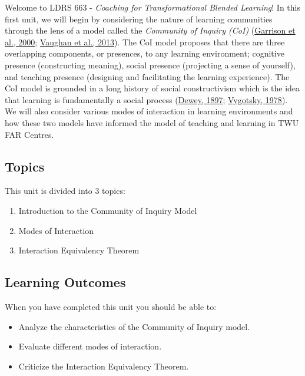 \documentclass[
]{book}
\providecommand{\tightlist}{%
  \setlength{\itemsep}{0pt}\setlength{\parskip}{0pt}}
\begin{document}
Welcome to LDRS 663 - \emph{Coaching for Transformational Blended Learning}! In this first unit, we will begin by considering the nature of learning communities through the lens of a model called the \emph{Community of Inquiry (CoI)} (\href{https://www.sciencedirect.com/science/article/pii/S1096751600000166?}{Garrison et al., 2000}; \href{http://www.aupress.ca/index.php/books/120229}{Vaughan et al., 2013}). The CoI model proposes that there are three overlapping components, or presences, to any learning environment; cognitive presence (constructing meaning), social presence (projecting a sense of yourself), and teaching presence (designing and facilitating the learning experience). The CoI model is grounded in a long history of social constructivism which is the idea that learning is fundamentally a social process (\href{https://en.wikisource.org/wiki/My_Pedagogic_Creed}{Dewey, 1897}; \href{https://twu.idm.oclc.org/login?url=http://search.ebscohost.com/login.aspx?direct=true\&db=cat05965a\&AN=alc.191437\&site=eds-live}{Vygotsky, 1978}). We will also consider various modes of interaction in learning environments and how these two models have informed the model of teaching and learning in TWU FAR Centres.

\hypertarget{topics}{%
\subsection*{Topics}\label{topics}}

This unit is divided into 3 topics:

\begin{enumerate}
\def\labelenumi{\arabic{enumi}.}
\item
  Introduction to the Community of Inquiry Model
\item
  Modes of Interaction
\item
  Interaction Equivalency Theorem
\end{enumerate}

\hypertarget{learning-outcomes}{%
\subsection*{Learning Outcomes}\label{learning-outcomes}}

When you have completed this unit you should be able to:

\begin{itemize}
\tightlist
\item
  Analyze the characteristics of the Community of Inquiry model.
\item
  Evaluate different modes of interaction.
\item
  Criticize the Interaction Equivalency Theorem.
\end{itemize}
\end{document}
